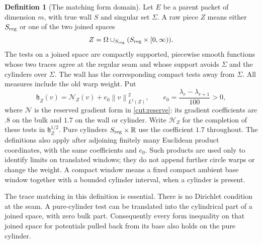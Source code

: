 \documentclass[11pt]{article}
\numberwithin{equation}{section}
\theoremstyle{definition}
\newtheorem{definition}[theorem]{Definition}
\theoremstyle{remark}
\begin{document}
\begin{definition}[The matching form domain]\label{shield:domain}
Let $E$ be a parent packet of dimension $m$, with true wall $S$ and singular
set $\Sigma$.  A raw piece $Z$ means either $S_{\rm reg}$ or one of the two
joined spaces
\[
 Z=\Omega\mathbin{\cup}_{S_{\rm reg}}
                 (S_{\rm reg}\times[0,\infty)).
\]
The tests on a joined space are compactly supported, piecewise smooth
functions whose two traces agree at the regular seam and whose support
avoids $\Sigma$ and the cylinders over $\Sigma$.  The wall has the
corresponding compact tests away from $\Sigma$.  All measures include the
old warp weight.  Put
\begin{equation}\label{shield:hilbert}
 \mathfrak h_Z(v)=\mathcal N_Z(v)+e_0\left\lVert{v}\right\rVert_{L^2(Z)}^2,
 \qquad e_0=\frac{\lambda_r-\lambda_{r+1}}{100}>0,
\end{equation}
where $\mathcal N$ is the reserved gradient form in \cref{cut:reserve}:
its gradient coefficients are $.8$ on the bulk and $1.7$ on the wall or
cylinder.  Write $\mathcal H_Z$ for the completion of these tests in
$\mathfrak h_Z^{1/2}$.  Pure cylinders $S_{\rm reg}\times\mathbb R$ use the
coefficient $1.7$ throughout.  The definitions also apply after adjoining
finitely many Euclidean product coordinates, with the same coefficients
and $e_0$.  Such products are used only to identify limits on translated
windows; they do not append further circle warps or change the weight.
A compact window means a fixed compact ambient base window together with
a bounded cylinder interval, when a cylinder is present.
\end{definition}

The trace matching in this definition is essential.  There is no
Dirichlet condition at the seam.  A pure-cylinder test can be translated
into the cylindrical part of a joined space, with zero bulk part.
Consequently every form inequality on that joined space for potentials
pulled back from its base also holds on the pure cylinder.
\end{document}
